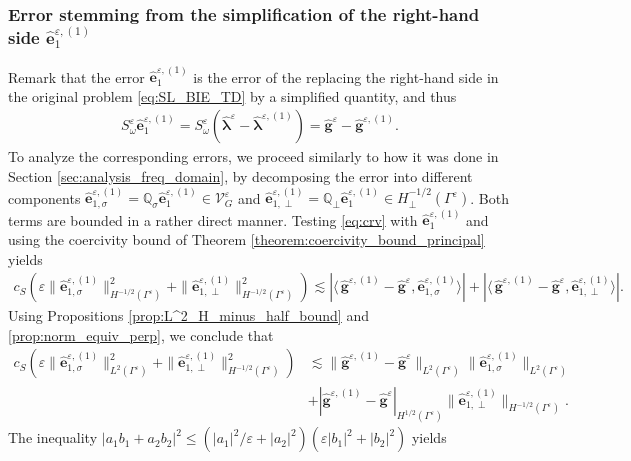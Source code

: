 \documentclass[]{article}
\numberwithin{equation}{section}
\numberwithin{theorem}{section}
\numberwithin{lemma}{section}
\numberwithin{corollary}{section}
\numberwithin{proposition}{section}
\numberwithin{definition}{section}
\newcommand{\blambda}{\boldsymbol{\lambda}}
\newcommand{\re}{\varepsilon}
\renewcommand{\vec}{\boldsymbol}
\begin{document}
	\subsubsection{Error stemming from the simplification of the right-hand side $\hat{\vec{e}}_1^{\re, (1)}$}
	\label{sec:ere1}
	Remark that the error $\hat{\vec{e}}_1^{\re, (1)}$ is the error of the replacing the right-hand side in the original problem \eqref{eq:SL_BIE_TD} by a simplified quantity, and thus
	\begin{align}
		\label{eq:crv}
		{S}^{\varepsilon}_{\omega}\hat{\vec{e}}_1^{\re,(1)}=	{S}^{\varepsilon}_{\omega}(\hat{{\blambda}}^{\varepsilon}-\hat{\blambda}^{\varepsilon,(1)})=\hat{{\vec{g}}}^{\re}-\hat{\vec{g}}^{\re,(1)}.
	\end{align}
	To analyze the corresponding errors, we proceed similarly to how it was done in Section \ref{sec:analysis_freq_domain}, by decomposing the error into different components $\hat{\vec{e}}^{\re,(1)}_{1, \sigma}=\mathbb{Q}_{\sigma}\hat{\vec{e}}^{\re,(1)}_1\in \mathcal{V}_G^{\re}$ and $\hat{\vec{e}}^{\re,(1)}_{1, \perp}=\mathbb{Q}_{\perp}\hat{\vec{e}}^{\re,(1)}_1\in H^{-1/2}_{\perp}(\Gamma^{\re})$. Both terms are bounded in a rather direct manner. Testing \eqref{eq:crv} with $\hat{\vec{e}}^{\re,(1)}_{1}$ and using the coercivity bound of Theorem \ref{theorem:coercivity_bound_principal} yields
	\begin{align*}%
		c_S(\varepsilon\|\hat{\vec{e}}^{\re,(1)}_{1,\sigma}\|^2_{H^{-1/2}(\Gamma^{\re})}+\|\hat{\vec{e}}^{\re,(1)}_{1,\perp}\|^2_{H^{-1/2}(\Gamma^{\re})})\lesssim |\langle \,	\hat{{\vec{g}}}^{\re,(1)}-\hat{\vec{g}}^{\re}, \hat{\vec{e}}^{\re,(1)}_{1,\sigma}\rangle| + |\langle \,	{\hat{\vec{g}}}^{\re,(1)}-\hat{\vec{g}}^{\re}, \hat{\vec{e}}^{\re,(1)}_{1,\perp}\rangle|.
	\end{align*}
	Using Propositions \ref{prop:L^2_H_minus_half_bound} and \ref{prop:norm_equiv_perp}, we conclude that
	\begin{align*}%
		c_S	\left(\varepsilon\|\hat{\vec{e}}^{\re,(1)}_{1,\sigma}\|^2_{L^2(\Gamma^{\re})}+\|\hat{\vec{e}}^{\re,(1)}_{1,\perp}\|^2_{H^{-1/2}(\Gamma^{\re})}\right)&\lesssim \|\hat{\vec{g}}^{\re,(1)}-\hat{\vec{g}}^{\re}\|_{L^2(\Gamma^{\re})}\|\hat{\vec{e}}^{\re,(1)}_{1,\sigma}\|_{L^2(\Gamma^{\re})}\\
		&+|\hat{\vec{g}}^{\re,(1)}-\hat{\vec{g}}^{\re}|_{H^{1/2}(\Gamma^{\re})}\|\hat{\vec{e}}^{\re,(1)}_{1,\perp}\|_{H^{-1/2}(\Gamma^{\re})}.
	\end{align*}
	The inequality
	$|a_1b_1+a_2b_2|^2\leq (|a_1|^2/\re+|a_2|^2)(\re|b_1|^2+|b_2|^2)$ yields
\end{document}
